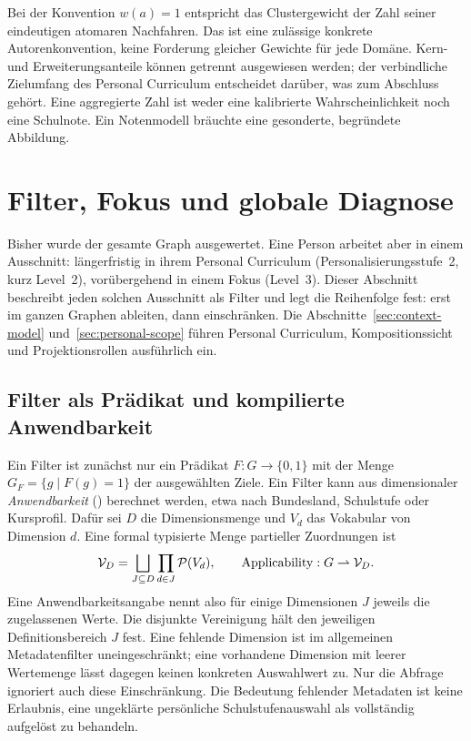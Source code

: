 Bei der Konvention $w(a)=1$ entspricht das Clustergewicht der Zahl seiner
eindeutigen atomaren Nachfahren. Das ist eine zulässige konkrete
Autorenkonvention, keine Forderung gleicher Gewichte für jede Domäne.
Kern- und Erweiterungsanteile können getrennt ausgewiesen werden; der
verbindliche Zielumfang des Personal Curriculum entscheidet darüber, was zum
Abschluss gehört. Eine aggregierte Zahl ist weder eine kalibrierte
Wahrscheinlichkeit noch eine Schulnote. Ein Notenmodell bräuchte eine
gesonderte, begründete Abbildung.

\FloatBarrier
\section{Filter, Fokus und globale Diagnose}
\label{sec:filters}
Bisher wurde der gesamte Graph ausgewertet. Eine Person arbeitet aber in
einem Ausschnitt: längerfristig in ihrem Personal Curriculum
(Personalisierungsstufe~2, kurz Level~2), vorübergehend in einem Fokus
(Level~3). Dieser Abschnitt beschreibt jeden solchen Ausschnitt als Filter
und legt die Reihenfolge fest: erst im ganzen Graphen ableiten, dann
einschränken. Die Abschnitte~\ref{sec:context-model}
und~\ref{sec:personal-scope} führen Personal Curriculum, Kompositionssicht
und Projektionsrollen ausführlich ein.

\subsection{Filter als Prädikat und kompilierte Anwendbarkeit}
Ein Filter ist zunächst nur ein Prädikat $F:G\to\{0,1\}$ mit der Menge
$G_F=\{g\mid F(g)=1\}$ der ausgewählten Ziele. Ein Filter kann aus
dimensionaler \emph{Anwendbarkeit} () berechnet werden,
etwa nach Bundesland, Schulstufe oder Kursprofil. Dafür sei $D$
die Dimensionsmenge und $V_d$ das Vokabular von Dimension $d$. Eine
formal typisierte Menge partieller Zuordnungen ist
\[
 \mathcal V_D=\bigsqcup_{J\subseteq D}\prod_{d\in J}\mathcal{P}(V_d),\qquad
 \operatorname{Applicability}:G\rightharpoonup\mathcal V_D.
\]
Eine Anwendbarkeitsangabe nennt also für einige Dimensionen $J$ jeweils die
zugelassenen Werte. Die disjunkte Vereinigung hält den jeweiligen
Definitionsbereich $J$ fest.
Eine fehlende Dimension ist im allgemeinen Metadatenfilter uneingeschränkt;
eine vorhandene Dimension mit leerer Wertemenge lässt dagegen keinen
konkreten Auswahlwert zu. Nur die Abfrage  ignoriert auch diese
Einschränkung. Die Bedeutung fehlender Metadaten ist keine
Erlaubnis, eine ungeklärte persönliche Schulstufenauswahl als vollständig
aufgelöst zu behandeln.

